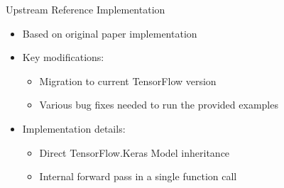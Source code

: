 \documentclass{beamer}
\begin{document}
\begin{frame}{Upstream Reference Implementation}
    \begin{itemize}
        \item Based on original paper implementation
        \item Key modifications:
        \begin{itemize}
            \item Migration to current TensorFlow version
            \item Various bug fixes needed to run the provided examples
        \end{itemize}
        \item Implementation details:
        \begin{itemize}
            \item Direct TensorFlow.Keras Model inheritance
            \item Internal forward pass in a single function call
        \end{itemize}
    \end{itemize}
\end{frame}
\end{document}
